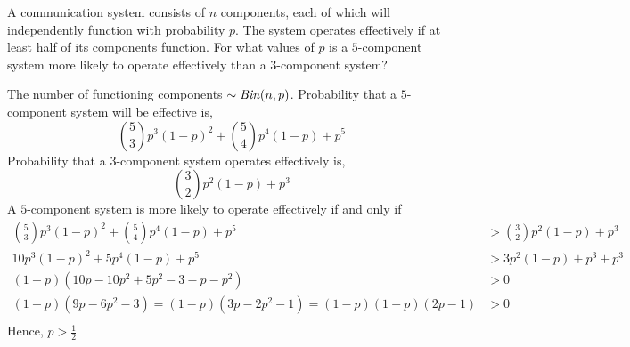 \begin{example}
    A communication system consists of $n$ components, each of which will
independently function with probability $p$. The system operates effectively if
at least half of its components function. For what values of $p$ is a
$5$-component system more likely to operate effectively than a $3$-component
system?
\end{example}
\begin{solution}
    The number of functioning components $\sim \text{\emph{Bin}}(n, p)$.
Probability that a $5$-component system will be effective is,
\[ {5 \choose 3} p^3 (1-p)^2 + {5 \choose 4} p^4 (1 - p) + p^5 \]
Probability that a $3$-component system operates effectively is,
\[ {3 \choose 2} p^2 (1-p) + p^3 \]
A $5$-component system is more likely to operate effectively if and only if
\begin{align*}
    {5 \choose 3} p^3 (1-p)^2 + {5 \choose 4} p^4 (1 - p) + p^5 &>
    {3 \choose 2} p^2 (1-p) + p^3                                           \\
    10p^3(1-p)^2 + 5p^4(1-p) + p^5 &> 3p^2(1-p) + p^3 + p^3                 \\
    (1-p)(10p - 10p^2 + 5p^2 - 3 - p - p^2) &> 0                            \\
    (1-p)(9p - 6p^2 - 3) = (1-p)(3p - 2p^2 - 1) = (1-p)(1-p)(2p-1) &> 0     \\
\end{align*}
Hence, $p > \frac{1}{2}$
\end{solution}